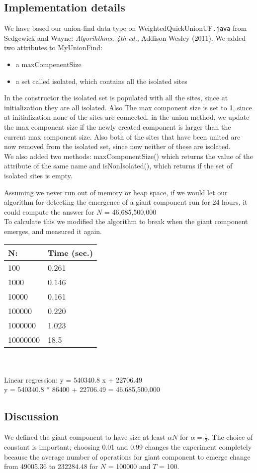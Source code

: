 \documentclass{tufte-handout}
\begin{document}
\subsection{Implementation details}

We have based our union-find data type on {WeightedQuickUnionUF\tt .java} from Sedgewick and Wayne: {\em Algorihthms, 4th ed.}, Addison-Wesley (2011). We added two attributes to MyUnionFind:
\begin{itemize}
\item a maxCompenentSize
\item a set called isolated, which contains all the isolated sites
\end{itemize}
In the constructor the isolated set is populated with all the sites, since at initialization they are all isolated. Also The max component size is set to 1, since at initialization none of the sites are connected.
in the union method, we update the max component size if the newly created component is larger than the current max component size.
Also both of the sites that have been united are now removed from the isolated set, since now neither of these are isolated. \\
We also added two methods: maxComponentSize() which returns the value of the attribute of the same name and isNonIsolated(), which returns if the set of isolated sites is empty.

Assuming we never run out of memory or heap space, if we would let our algorithm for detecting the emergence of a giant component run for 24 hours, it could compute the answer for $N$ = 46,685,500,000 \\

To calculate this we modified the algorithm to break when the giant component emerges, and measured it again. \\

\begin{tabular}{ll}
  \toprule
  N: & Time (sec.) \\
  \midrule
  100 & 0.261 \\
  1000 & 0.146 \\
  10000 & 0.161 \\
  100000 & 0.220 \\
  1000000 & 1.023 \\
  10000000 & 18.5 \\
  \bottomrule
\end{tabular}\\ \\

Linear regression: y = 540340.8 x + 22706.49 \\

		y = 540340.8 * 86400 + 22706.49 = 46,685,500,000 

\subsection{Discussion}

We defined the giant component to have size at least $\alpha N$ for $\alpha = \frac{1}{2}$. The choice of constant is important; choosing 0.01 and 0.99 changes the experiment completely because
the average number of operations for giant component to emerge change from 49005.36 to 232284.48 for  $N$ = 100000 and  $T$ = 100. 
\end{document}
